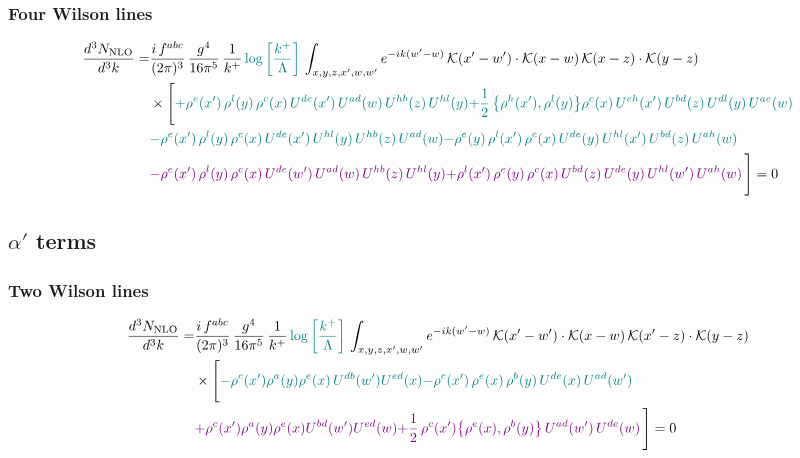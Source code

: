 \documentclass[9pt]{article}
\numberwithin{equation}{section}
\begin{document}
\subsubsection{Four Wilson lines}
\begin{align}
\frac{d^{3}N_{\rm NLO}}{d^{3}k} = &\frac{i\,f^{abc}}{(2\pi)^{3}}\,\frac{g^{4}}{16\pi^{5}}\,\frac{1}{k^{+}}\,{\color{teal}\log{\left[\frac{k^{+}}{\Lambda}\right]}}\,\int_{x,y,z,x',w,w'}e^{-ik(w'-w)}\,\mathcal{K}(x'-w')\cdot\mathcal{K}(x-w)\,\mathcal{K}(x-z)\cdot\mathcal{K}(y-z)\notag\\
&\times\Bigg[{\color{teal}+\rho^{e}(x')\, \rho^{l}(y)\,\rho^{c}(x)\, U^{de}(x')\,U^{ad}(w)\,U^{hb}(z)\,U^{hl}(y)}{\color{teal}+\frac{1}{2}\,\big\{\rho^{h}(x'),\rho^{l}(y)\big\}\rho^{c}(x)\,U^{eh}(x')\,U^{bd}(z)\,U^{dl}(y)\,U^{ae}(w)}\notag \\
&{\color{teal}-\rho^{e}(x')\,\rho^{l}(y)\,\rho^{c}(x)\,U^{de}(x')\,U^{hl}(y)\,U^{hb}(z)\,U^{ad}(w)}{\color{teal}-\rho^{e}(y)\,\rho^{l}(x')\,\rho^{c}(x)\,U^{de}(y)\,U^{hl}(x')\,U^{bd}(z)\,U^{ah}(w)} \notag \\ &{\color{violet}-\rho^{e}(x')\, \rho^{l}(y)\,\rho^{c}(x)\, U^{de}(w')\,U^{ad}(w)\,U^{hb}(z)\,U^{hl}(y)}{\color{violet}+\rho^{l}(x')\,\rho^{e}(y)\,\rho^{c}(x)\,U^{bd}(z)\,U^{de}(y)\,U^{hl}(w')\,U^{ah}(w)}\,\Bigg] = 0
\end{align}
\subsection{$\alpha'$ terms}
\subsubsection{Two Wilson lines}
\begin{align}
\frac{d^{3}N_{\rm NLO}}{d^{3}k}= & \frac{i\,f^{abc}}{(2\pi)^{3}}\,\frac{g^{4}}{16\pi^{5}}\,\frac{1}{k^{+}}\,{\color{teal}\log{\left[\frac{k^{+}}{\Lambda}\right]}}\,\int_{x,y,z,x',w,w'}e^{-ik(w'-w)}\,\mathcal{K}(x'-w')\cdot\mathcal{K}(x-w)\,\mathcal{K}(x'-z)\cdot\mathcal{K}(y-z)\notag \\ & \times\Bigg[ {\color{teal}-\rho^{c}(x') \rho^{a}(y) \rho^{e}(x)\,U^{d b}(w') U^{e d}(x)}{\color{teal}-\rho^{c}(x')\,\rho^{e}(x)\,\rho^{b}(y)\,U^{de}(x)\,U^{ad}(w')}\notag \\
&{\color{violet}+\rho^{c}(x') \rho^{a}(y) \rho^{e}(x) U^{b d}(w') U^{e d}(w)}{\color{violet}+\frac{1}{2}\,\rho^{c}(x')\big\{\rho^{e}(x),\rho^{b}(y)\big\}\,U^{ad}(w')\,U^{de}(w)}\,\Bigg] = 0
\end{align}
\end{document}
